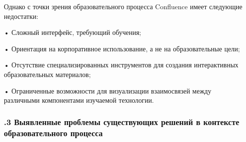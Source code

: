 {  \par \redline Однако с точки зрения образовательного процесса Confluence имеет следующие недостатки:
  
  \par \redline • Сложный интерфейс, требующий обучения;
  \par \redline • Ориентация на корпоративное использование, а не на образовательные цели;
  \par \redline • Отсутствие специализированных инструментов для создания интерактивных образовательных материалов;
  \par \redline • Ограниченные возможности для визуализации взаимосвязей между различными компонентами изучаемой технологии.

  \par
}

\subtitlespace

\subsubsection*{ 
  \gostTitleFont
  .3 Выявленные проблемы существующих решений в контексте образовательного процесса
} 

\subtitlespace

